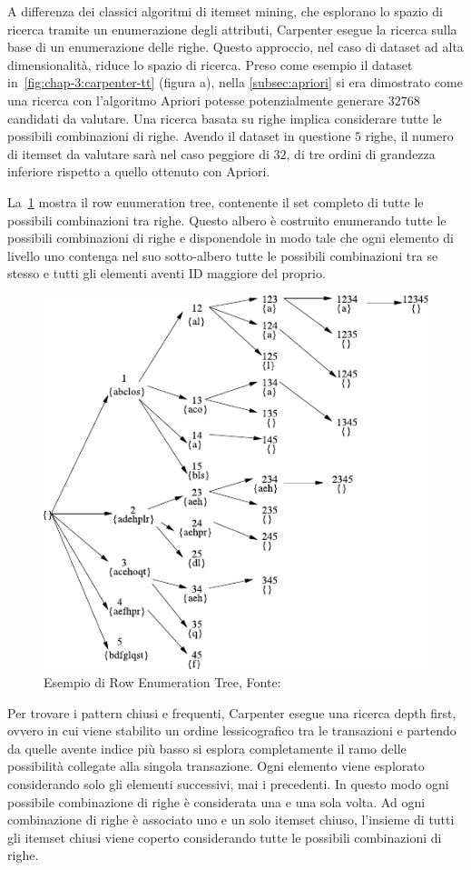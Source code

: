 A differenza dei classici algoritmi di itemset mining, che esplorano lo spazio di ricerca tramite un enumerazione degli attributi, Carpenter esegue la ricerca sulla base di un enumerazione delle righe.
Questo approccio, nel caso di dataset ad alta dimensionalità, riduce lo spazio di ricerca.
Preso come esempio il dataset in~\cref{fig:chap-3:carpenter-tt} (figura a), nella \cref{subsec:apriori} si era dimostrato come una ricerca con l'algoritmo Apriori potesse potenzialmente generare \(32768\) candidati da valutare.
Una ricerca basata su righe implica considerare tutte le possibili combinazioni di righe.
Avendo il dataset in questione \(5\) righe, il numero di itemset da valutare sarà nel caso peggiore di \(32\), di tre ordini di grandezza inferiore rispetto a quello ottenuto con Apriori.

La~\cref{fig:chap-3:carpenter-ret} mostra il row enumeration tree, contenente il set completo di tutte le possibili combinazioni tra righe.
Questo albero è costruito enumerando tutte le possibili combinazioni di righe e disponendole in modo tale che ogni elemento di livello uno contenga nel suo sotto-albero tutte le possibili combinazioni tra se stesso e tutti gli elementi aventi ID maggiore del proprio.

\begin{figure}
  \centering
  \includegraphics[width=.5\textwidth]{res/fig/sec-3/RowEnumerationTree.pdf}
  \caption{Esempio di Row Enumeration Tree, Fonte:~\cite{pan2003carpenter}}%
  \label{fig:chap-3:carpenter-ret}
\end{figure}

Per trovare i pattern chiusi e frequenti, Carpenter esegue una ricerca depth first, ovvero in cui viene stabilito un ordine lessicografico tra le transazioni e partendo da quelle avente indice più basso si esplora completamente il ramo delle possibilità collegate alla singola transazione.
Ogni elemento viene esplorato considerando solo gli elementi successivi, mai i precedenti.
In questo modo ogni possibile combinazione di righe è considerata una e una sola volta.
Ad ogni combinazione di righe è associato uno e un solo itemset chiuso, l'insieme di tutti gli itemset chiusi viene coperto considerando tutte le possibili combinazioni di righe.

